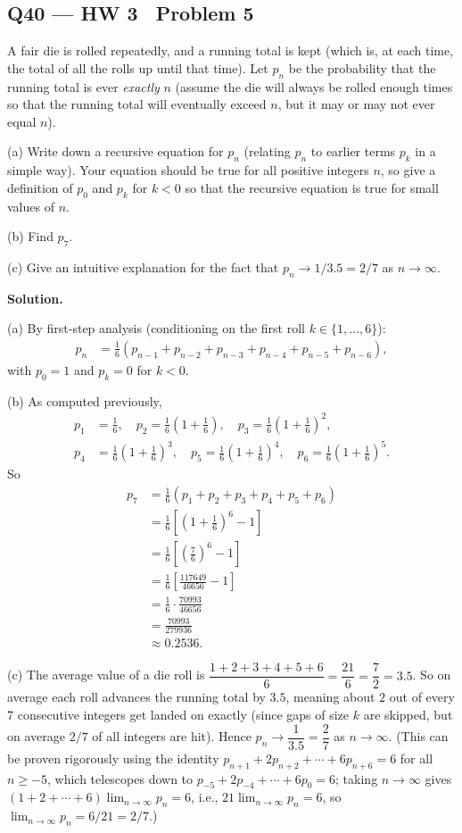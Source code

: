\documentclass[11pt]{article}
\begin{document}
\subsection*{Q40 --- HW 3 \textperiodcentered\ Problem 5}
\begin{qbox}
A fair die is rolled repeatedly, and a running total is kept (which is, at each time, the total of all the rolls up until that time). Let $p_n$ be the probability that the running total is ever \textit{exactly} $n$ (assume the die will always be rolled enough times so that the running total will eventually exceed $n$, but it may or may not ever equal $n$).

(a) Write down a recursive equation for $p_n$ (relating $p_n$ to earlier terms $p_k$ in a simple way). Your equation should be true for all positive integers $n$, so give a definition of $p_0$ and $p_k$ for $k < 0$ so that the recursive equation is true for small values of $n$.

(b) Find $p_7$.

(c) Give an intuitive explanation for the fact that $p_n \to 1/3.5=2/7$ as $n \to \infty$.
\end{qbox}
\textbf{Solution.}

(a) By first-step analysis (conditioning on the first roll $k\in\{1,\dots,6\}$):
\begin{align*}
p_n &= \frac16\left(p_{n-1}+p_{n-2}+p_{n-3}+p_{n-4}+p_{n-5}+p_{n-6}\right),
\end{align*}
with $p_0=1$ and $p_k=0$ for $k<0$.

(b) As computed previously,
\begin{align*}
p_1 &= \frac16, \quad p_2=\frac16\left(1+\frac16\right), \quad p_3=\frac16\left(1+\frac16\right)^2,\\
p_4 &= \frac16\left(1+\frac16\right)^3, \quad p_5=\frac16\left(1+\frac16\right)^4, \quad p_6=\frac16\left(1+\frac16\right)^5.
\end{align*}
So
\begin{align*}
p_7 &= \frac16(p_1+p_2+p_3+p_4+p_5+p_6) \\
&= \frac16\left[\left(1+\frac16\right)^6-1\right] \\
&= \frac16\left[\left(\frac76\right)^6-1\right] \\
&= \frac16\left[\frac{117649}{46656}-1\right] \\
&= \frac16\cdot\frac{70993}{46656} \\
&= \frac{70993}{279936} \\
&\approx 0.2536.
\end{align*}

(c) The average value of a die roll is $\dfrac{1+2+3+4+5+6}{6}=\dfrac{21}{6}=\dfrac{7}{2}=3.5$. So on average each roll advances the running total by $3.5$, meaning about $2$ out of every $7$ consecutive integers get landed on exactly (since gaps of size $k$ are skipped, but on average $2/7$ of all integers are hit). Hence $p_n \to \dfrac{1}{3.5} = \dfrac{2}{7}$ as $n\to\infty$. (This can be proven rigorously using the identity $p_{n+1}+2p_{n+2}+\cdots+6p_{n+6}=6$ for all $n\ge -5$, which telescopes down to $p_{-5}+2p_{-4}+\cdots+6p_0=6$; taking $n\to\infty$ gives $(1+2+\cdots+6)\lim_{n\to\infty}p_n=6$, i.e., $21\lim_{n\to\infty}p_n=6$, so $\lim_{n\to\infty}p_n = 6/21=2/7$.)
\end{document}
